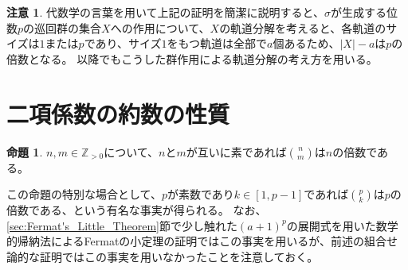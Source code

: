 ﻿\documentclass{ltjsarticle}
\theoremstyle{definition}
\newtheorem{proposition}{命題}
\newtheorem{remark}{注意}
\begin{document}
\begin{remark}
    \label{rem:Fermat's_Little_Theorem}
    代数学の言葉を用いて上記の証明を簡潔に説明すると、$\sigma$が生成する位数$p$の巡回群の集合$X$への作用について、$X$の軌道分解を考えると、各軌道のサイズは$1$または$p$であり、サイズ$1$をもつ軌道は全部で$a$個あるため、$|X| - a$は$p$の倍数となる。
    以降でもこうした群作用による軌道分解の考え方を用いる。
\end{remark}


\section{二項係数の約数の性質}

\begin{proposition}
    \label{prop:binomial_divisible_by_n}
    $n,m \in \mathbb{Z}_{>0}$について、$n$と$m$が互いに素であれば$\binom{n}{m}$は$n$の倍数である。
\end{proposition}

この命題の特別な場合として、$p$が素数であり$k \in [1,p-1]$であれば$\binom{p}{k}$は$p$の倍数である、という有名な事実が得られる。
なお、\ref{sec:Fermat's_Little_Theorem}節で少し触れた$(a+1)^p$の展開式を用いた数学的帰納法によるFermatの小定理の証明ではこの事実を用いるが、前述の組合せ論的な証明ではこの事実を用いなかったことを注意しておく。
\end{document}
